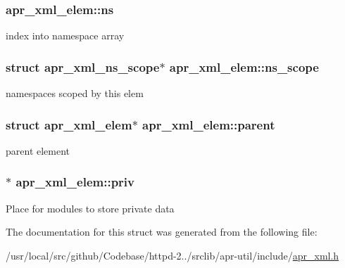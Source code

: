 \subsubsection[{\texorpdfstring{ns}{ns}}]{ apr\+\_\+xml\+\_\+elem\+::ns}\hypertarget{structapr__xml__elem_a613ea31964572df7b41f5a9da8d0982e}{}\label{structapr__xml__elem_a613ea31964572df7b41f5a9da8d0982e}
index into namespace array 
\subsubsection[{\texorpdfstring{ns\+\_\+scope}{ns_scope}}]{\setlength{\rightskip}{0pt plus 5cm}struct {\bf apr\+\_\+xml\+\_\+ns\+\_\+scope}$\ast$ apr\+\_\+xml\+\_\+elem\+::ns\+\_\+scope}\hypertarget{structapr__xml__elem_addfd70c22965dca4f7574639424a0c32}{}\label{structapr__xml__elem_addfd70c22965dca4f7574639424a0c32}
namespaces scoped by this elem 
\subsubsection[{\texorpdfstring{parent}{parent}}]{\setlength{\rightskip}{0pt plus 5cm}struct {\bf apr\+\_\+xml\+\_\+elem}$\ast$ apr\+\_\+xml\+\_\+elem\+::parent}\hypertarget{structapr__xml__elem_a0fd30b383f2659a9ef245c2e99cb707d}{}\label{structapr__xml__elem_a0fd30b383f2659a9ef245c2e99cb707d}
parent element 
\subsubsection[{\texorpdfstring{priv}{priv}}]{$\ast$ apr\+\_\+xml\+\_\+elem\+::priv}\hypertarget{structapr__xml__elem_a0bc4296aedb5d047325f86080604d939}{}\label{structapr__xml__elem_a0bc4296aedb5d047325f86080604d939}
Place for modules to store private data 

The documentation for this struct was generated from the following file\+:\begin{DoxyCompactItemize}
\item 
/usr/local/src/github/\+Codebase/httpd-\/2../srclib/apr-\/util/include/\hyperlink{apr__xml_8h}{apr\+\_\+xml.\+h}\end{DoxyCompactItemize}
